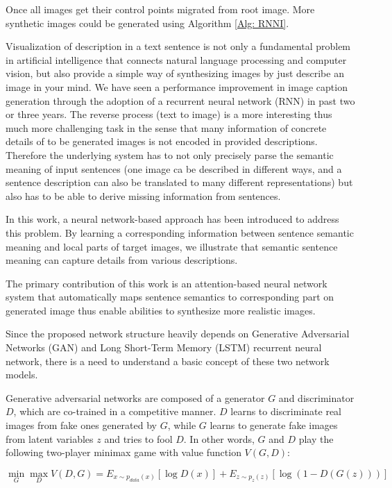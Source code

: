 \documentclass{iitthesis}
\begin{document}
Once all images get their control points migrated from root image. More synthetic images could be generated using Algorithm \ref{Alg: RNNI}.

 Visualization of description in a text sentence is not only a fundamental problem in artificial intelligence that connects natural language processing and computer vision, but also provide a simple way of synthesizing images by just describe an image in your mind. We have seen a performance improvement in image caption generation through the adoption of a recurrent neural network (RNN) in past two or three years. The reverse process (text to image) is a more interesting thus much more challenging task in the sense that many information of concrete details of to be generated images is not encoded in provided descriptions. Therefore the underlying system has to not only precisely parse the semantic meaning of input sentences (one image ca be described in different ways, and a sentence description can also be translated to many different representations) but also has to be able to derive missing information from sentences. 

In this work, a neural network-based approach has been introduced to address this problem. By learning a corresponding information between sentence semantic meaning and local parts of target images, we illustrate that semantic sentence meaning can capture details from various descriptions. 

The primary contribution of this work is an attention-based neural network system that automatically maps sentence semantics to corresponding part on generated image thus enable abilities to synthesize more realistic images.

Since the proposed network structure heavily depends on Generative Adversarial Networks (GAN) and Long Short-Term Memory (LSTM) recurrent neural network, there is a need to understand a basic concept of these two network models.

 Generative adversarial networks are composed of a generator $G$ and discriminator $D$, which are co-trained in a competitive manner. $D$ learns to discriminate real images from fake ones generated by $G$, while $G$ learns to generate fake images from latent variables $z$ and tries to fool $D$. In other words, $G$ and $D$ play the following two-player minimax game with value function $V(G, D)$:

\begin{equation}
\min_{G}\max_{D}V(D, G) = E_{x\sim p_{data}(x)}\left[ \log{D(x)}\right] + E_{z\sim p_{z}(z)}\left[\log(1-D(G(z))) \right]
\end{equation} 
\end{document}
